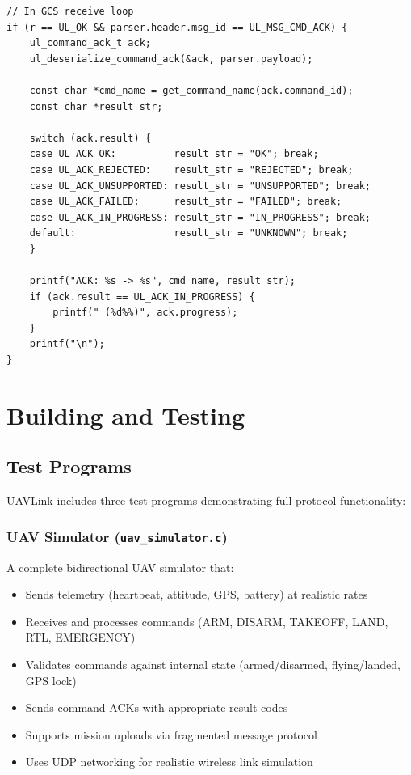 \documentclass[11pt,a4paper]{article}
\begin{document}
\begin{lstlisting}[caption={GCS: Receive and display ACK}]
// In GCS receive loop
if (r == UL_OK && parser.header.msg_id == UL_MSG_CMD_ACK) {
    ul_command_ack_t ack;
    ul_deserialize_command_ack(&ack, parser.payload);
    
    const char *cmd_name = get_command_name(ack.command_id);
    const char *result_str;
    
    switch (ack.result) {
    case UL_ACK_OK:          result_str = "OK"; break;
    case UL_ACK_REJECTED:    result_str = "REJECTED"; break;
    case UL_ACK_UNSUPPORTED: result_str = "UNSUPPORTED"; break;
    case UL_ACK_FAILED:      result_str = "FAILED"; break;
    case UL_ACK_IN_PROGRESS: result_str = "IN_PROGRESS"; break;
    default:                 result_str = "UNKNOWN"; break;
    }
    
    printf("ACK: %s -> %s", cmd_name, result_str);
    if (ack.result == UL_ACK_IN_PROGRESS) {
        printf(" (%d%%)", ack.progress);
    }
    printf("\n");
}
\end{lstlisting}

\section{Building and Testing}

\subsection{Test Programs}

UAVLink includes three test programs demonstrating full protocol functionality:

\subsubsection{UAV Simulator (\texttt{uav\_simulator.c})}

A complete bidirectional UAV simulator that:
\begin{itemize}[noitemsep]
    \item Sends telemetry (heartbeat, attitude, GPS, battery) at realistic rates
    \item Receives and processes commands (ARM, DISARM, TAKEOFF, LAND, RTL, EMERGENCY)
    \item Validates commands against internal state (armed/disarmed, flying/landed, GPS lock)
    \item Sends command ACKs with appropriate result codes
    \item Supports mission uploads via fragmented message protocol
    \item Uses UDP networking for realistic wireless link simulation
\end{itemize}
\end{document}
